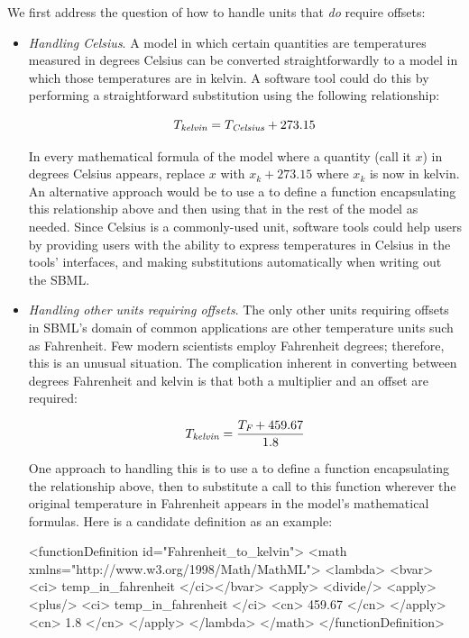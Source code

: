 We first address the question of how to handle units that
\emph{do} require offsets:
\begin{itemize}

\item \emph{Handling Celsius}.  A model in which certain
  quantities are temperatures measured in degrees Celsius can be
  converted straightforwardly to a model in which those
  temperatures are in kelvin.  A software tool could do this by
  performing a straightforward substitution using the following
  relationship:
  \begin{linenomath}
    \begin{equation}
      T_\emph{kelvin} = T_\emph{Celsius} + 273.15
      \label{eq:celsius-kelvin}
    \end{equation}
  \end{linenomath}
  In every mathematical formula of the model where a quantity
  (call it $x$) in degrees Celsius appears, replace $x$ with $x_k
  + 273.15$ where $x_k$ is now in kelvin.  An alternative approach
  would be to use a \FunctionDefinition to define a function
  encapsulating this relationship above and then using that in the
  rest of the model as needed.  Since Celsius is a commonly-used
  unit, software tools could help users by providing users with
  the ability to express temperatures in Celsius in the tools'
  interfaces, and making substitutions automatically when writing
  out the SBML.

\item \emph{Handling other units requiring offsets}.  The only
  other units requiring offsets in SBML's domain of common
  applications are other temperature units such as Fahrenheit.
  Few modern scientists employ Fahrenheit degrees; therefore, this
  is an unusual situation.  The complication inherent in
  converting between degrees Fahrenheit and kelvin is that both a
  multiplier and an offset are required:
  \begin{linenomath}
    \begin{equation}
      T_\emph{kelvin} = \frac{T_\emph{F} + 459.67}{1.8}
      \label{eq:fah-kelvin}
    \end{equation}
  \end{linenomath}

  One approach to handling this is to use a \FunctionDefinition to
  define a function encapsulating the relationship above, then to
  substitute a call to this function wherever the original
  temperature in Fahrenheit appears in the model's mathematical
  formulas.  Here is a candidate definition as an example:
  \begin{example}
<functionDefinition id="Fahrenheit_to_kelvin">
    <math xmlns="http://www.w3.org/1998/Math/MathML">
        <lambda>
            <bvar><ci> temp_in_fahrenheit </ci></bvar>
            <apply>
                <divide/>
                <apply>
                    <plus/>
                    <ci> temp_in_fahrenheit </ci>
                    <cn> 459.67 </cn>
                </apply>
                <cn> 1.8 </cn>
            </apply>
        </lambda>
    </math>
</functionDefinition>
  \end{example}
  

\end{itemize}
